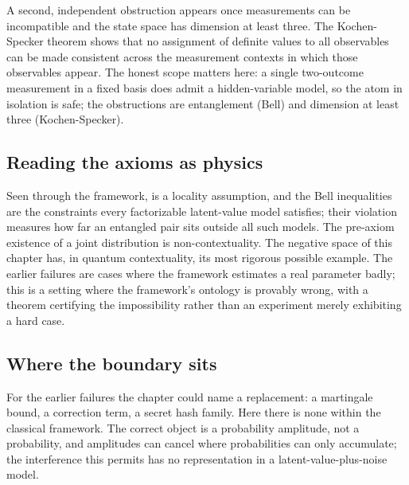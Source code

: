 A second, independent obstruction appears once measurements can be
incompatible and the state space has dimension at least three. The Kochen-Specker theorem \parencite{kochen-specker-1967} shows that no
assignment of definite values to all observables can be made consistent
across the measurement contexts in which those observables appear. The
honest scope matters here: a single two-outcome measurement in a fixed
basis does admit a hidden-variable model, so the atom in isolation is
safe; the obstructions are entanglement (Bell) and dimension at least
three (Kochen-Specker).

\subsection*{Reading the axioms as physics}

Seen through the framework,  is a locality
assumption, and the Bell inequalities are the constraints every
factorizable latent-value model satisfies; their violation measures how
far an entangled pair sits outside all such models. The pre-axiom existence of a joint distribution is
non-contextuality. The negative space of this chapter has, in quantum
contextuality, its most rigorous possible example. The earlier failures
are cases where the framework estimates a real parameter badly; this is a
setting where the framework's ontology is provably wrong, with a theorem
certifying the impossibility rather than an experiment merely exhibiting
a hard case.

\subsection*{Where the boundary sits}

For the earlier failures the chapter could name a replacement: a
martingale bound, a correction term, a secret hash family. Here there is
none within the classical framework. The correct object is a probability
amplitude, not a probability, and amplitudes can cancel where
probabilities can only accumulate; the interference this permits has no
representation in a latent-value-plus-noise model.

